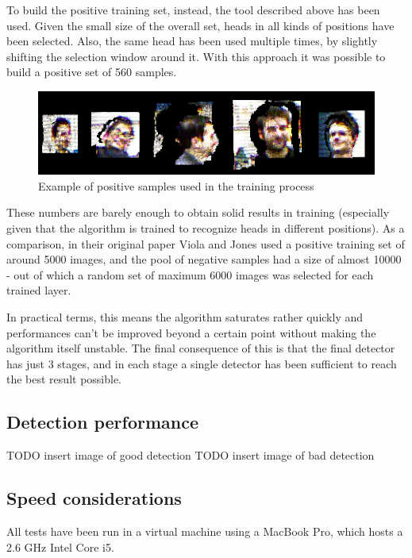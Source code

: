 \documentclass[a4paper,11pt,titlepage]{article}
\begin{document}
To build the positive training set, instead, the tool described above has been
used. Given the small size of the overall set, heads in all kinds of positions
have been selected. Also, the same head has been used multiple times, by
slightly shifting the selection window around it. With this approach it was
possible to build a positive set of 560 samples.

\begin{figure}[h]
  \centering
  \includegraphics[scale=0.8]{positive_samples.jpg}
  \caption{Example of positive samples used in the training process}
  \label{fig:positive_samples}
\end{figure}

These numbers are barely enough to obtain solid results in training (especially
given that the algorithm is trained to recognize heads in different positions).
As a comparison, in their original paper Viola and Jones used a positive
training set of around 5000 images, and the pool of negative samples had a size
of almost 10000 - out of which a random set of maximum 6000 images was selected
for each trained layer.

In practical terms, this means the algorithm saturates rather quickly and
performances can't be improved beyond a certain point without making the
algorithm itself unstable. The final consequence of this is that the final
detector has just 3 stages, and in each stage a single detector has been
sufficient to reach the best result possible.

\subsection{Detection performance}

TODO insert image of good detection
TODO insert image of bad detection

\subsection{Speed considerations}
All tests have been run in a virtual machine using a MacBook Pro, which hosts a
2.6 GHz Intel Core i5.
\end{document}
